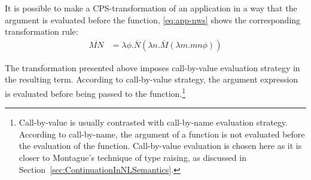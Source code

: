 It is possible to make a CPS-transformation of an application in a way that the argument is evaluated before the function, \eqref{eq:app-nws} shows the corresponding transformation rule:
%
\begin{align}
\overline{MN} & = \lambda \phi. \overline{N}(\lambda n. \overline{M}(\lambda m.mn \phi)) \label{eq:app-nws}
\end{align}

The transformation presented above imposes call-by-value evaluation strategy in the resulting term. According to call-by-value strategy, the argument expression is evaluated before being passed to the function.\footnote{Call-by-value is usually contrasted with call-by-name evaluation strategy. According to call-by-name, the argument of a function is not evaluated before the evaluation of the function. Call-by-value evaluation is chosen here as it is closer to Montague's technique of type raising, as discussed in Section~\ref{sec:ContinuationInNLSemantics}.}

